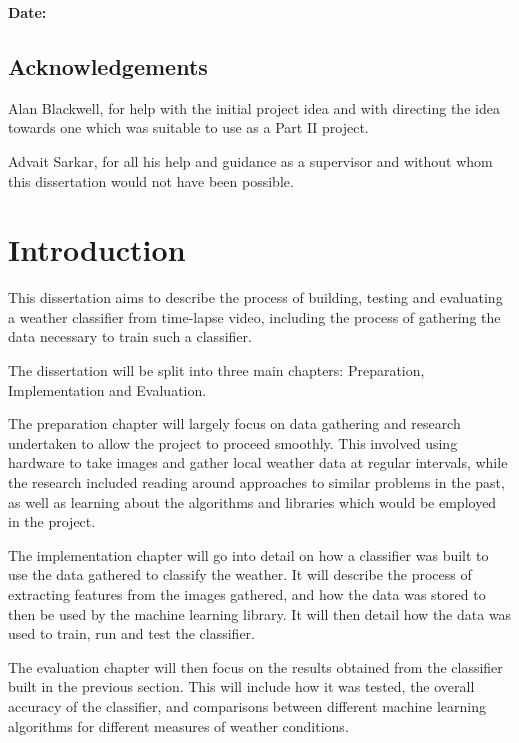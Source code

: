 \documentclass[a4paper,12pt,twoside]{report}
\begin{document}
\bigskip
{}

\bigskip
\leftline\bf{\bf Date:}

\newpage

\section*{Acknowledgements}
Alan Blackwell, for help with the initial project idea and with directing the idea towards one which was suitable to use as a Part II project.

Advait Sarkar, for all his help and guidance as a supervisor and  without whom this dissertation would not have been possible.

\tableofcontents

\listoffigures

\listoftables

\chapter{Introduction}
This dissertation aims to describe the process of building, testing and evaluating a weather classifier from time-lapse video, including the process of gathering the data necessary to train such a classifier. 

The dissertation will be split into three main chapters: Preparation, Implementation and Evaluation.

The preparation chapter will largely focus on data gathering and research undertaken to allow the project to proceed smoothly. This involved using hardware to take images and gather local weather data at regular intervals, while the research included reading around approaches to similar problems in the past, as well as learning about the algorithms and libraries which would be employed in the project.

The implementation chapter will go into detail on how a classifier was built to use the data gathered to classify the weather. It will describe the process of extracting features from the images gathered, and how the data was stored to then be used by the machine learning library. It will then detail how the data was used to train, run and test the classifier. 

The evaluation chapter will then focus on the results obtained from the classifier built in the previous section. This will include how it was tested, the overall accuracy of the classifier, and comparisons between different machine learning algorithms for different measures of weather conditions.
\end{document}
